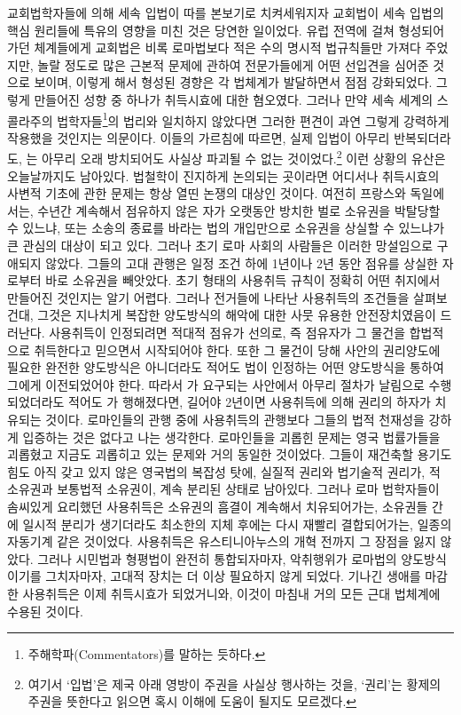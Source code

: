 교회법학자들에 의해 세속 입법이 따를 본보기로 치켜세워지자
교회법이 세속 입법의
핵심 원리들에 특유의 영향을 미친 것은 당연한 일이었다.
유럽 전역에 걸쳐 형성되어가던  체계들에게 교회법은
비록 로마법보다 적은 수의 명시적 법규칙들만 가져다 주었지만,
놀랄 정도로 많은 근본적 문제에 관하여
전문가들에게 어떤 선입견을 심어준 것으로 보이며,
이렇게 해서 형성된 경향은 각 법체계가 발달하면서 점점 강화되었다.
그렇게 만들어진 성향 중 하나가 취득시효에 대한 혐오였다.
그러나 만약
세속 세계의
스콜라주의 법학자들\footnote{%
  주해학파(Commentators)를 말하는 듯하다.
}의
법리와 일치하지 않았다면
그러한 편견이
과연 그렇게 강력하게 작용했을 것인지는 의문이다.
이들의 가르침에 따르면,
실제 입법이 아무리 반복되더라도,
는 아무리 오래 방치되어도
사실상 파괴될 수 없는 것이었다.\footnote{%
  여기서 `입법'은 제국 아래 영방이 주권을 사실상 행사하는 것을,
  `권리'는 황제의 주권을 뜻한다고 읽으면 혹시 이해에 도움이 될지도 모르겠다.
  }
이런 상황의 유산은 오늘날까지도 남아있다.
법철학이 진지하게 논의되는 곳이라면 어디서나
취득시효의 사변적 기초에 관한 문제는 항상 열띤 논쟁의 대상인 것이다.
여전히 프랑스와 독일에서는,
수년간 계속해서 점유하지 않은 자가
오랫동안 방치한 벌로
소유권을 박탈당할 수 있느냐,
또는 소송의 종료를 바라는 법의 개입만으로
소유권을 상실할 수 있느냐가
큰 관심의 대상이 되고 있다.
그러나 초기 로마 사회의 사람들은 이러한 망설임으로 구애되지 않았다.
그들의 고대 관행은
일정 조건 하에 1년이나 2년 동안 점유를 상실한 자로부터
바로 소유권을 빼앗았다.
초기 형태의 사용취득 규칙이 정확히 어떤 취지에서 만들어진 것인지는
알기 어렵다.
그러나 전거들에 나타난 사용취득의 조건들을 살펴보건대,
그것은 지나치게 복잡한 양도방식의 해악에 대한 사뭇 유용한 안전장치였음이
드러난다.
사용취득이 인정되려면
적대적 점유가 선의로,
즉 점유자가 그 물건을 합법적으로 취득한다고 믿으면서
시작되어야 한다.
또한 그 물건이
당해 사안의 권리양도에 필요한 완전한 양도방식은 아니더라도
적어도 법이 인정하는
어떤 양도방식을 통하여 그에게 이전되었어야 한다.
따라서 가 요구되는 사안에서
아무리 절차가 날림으로 수행되었더라도
적어도 가 행해졌다면,
길어야 2년이면 사용취득에 의해 권리의 하자가 치유되는 것이다.
로마인들의 관행 중에 사용취득의 관행보다
그들의 법적 천재성을 강하게 입증하는 것은 없다고 나는 생각한다.
로마인들을 괴롭힌 문제는 영국 법률가들을 괴롭혔고
지금도 괴롭히고 있는 문제와 거의 동일한 것이었다.
그들이 재건축할 용기도 힘도 아직 갖고 있지 않은
영국법의 복잡성 탓에,
실질적 권리와 법기술적 권리가,
적 소유권과 보통법적 소유권이,
계속 분리된 상태로 남아있다.
그러나 로마 법학자들이 솜씨있게 요리했던 사용취득은
소유권의 흠결이 계속해서 치유되어가는,
소유권들 간에 일시적 분리가 생기더라도
최소한의 지체 후에는 다시 재빨리 결합되어가는,
일종의 자동기계 같은 것이었다.
사용취득은 유스티니아누스의 개혁 전까지
그 장점을 잃지 않았다.
그러나 시민법과 형평법이 완전히 통합되자마자,
악취행위가 로마법의 양도방식이기를 그치자마자,
고대적 장치는 더 이상 필요하지 않게 되었다.
기나긴 생애를 마감한
사용취득은
이제
취득시효가 되었거니와,
이것이 마침내 거의 모든 근대 법체계에 수용된 것이다.

